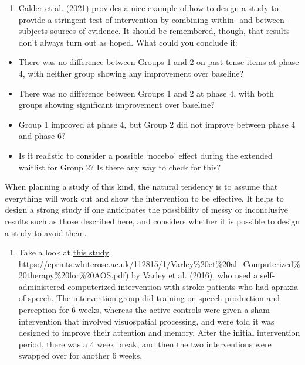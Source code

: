 \documentclass{krantz}
\providecommand{\tightlist}{%
\setlength{\itemsep}{0pt}\setlength{\parskip}{0pt}}
\begin{document}
\begin{enumerate}
\def\labelenumi{\arabic{enumi}.}
\tightlist
\item
  Calder et al. (\protect\hyperlink{ref-calder2021}{2021}) provides a nice example of how to design a study to provide a stringent test of intervention by combining within- and between-subjects sources of evidence. It should be remembered, though, that results don't always turn out as hoped. What could you conclude if:
\end{enumerate}

\begin{itemize}
\tightlist
\item
  There was no difference between Groups 1 and 2 on past tense items at phase 4, with neither group showing any improvement over baseline?\\
\item
  There was no difference between Groups 1 and 2 at phase 4, with both groups showing significant improvement over baseline?\\
\item
  Group 1 improved at phase 4, but Group 2 did not improve between phase 4 and phase 6?\\
\item
  Is it realistic to consider a possible `nocebo' effect during the extended waitlist for Group 2? Is there any way to check for this?
\end{itemize}

When planning a study of this kind, the natural tendency is to assume that everything will work out and show the intervention to be effective. It helps to design a strong study if one anticipates the possibility of messy or inconclusive results such as those described here, and considers whether it is possible to design a study to avoid them.

\begin{enumerate}
\def\labelenumi{\arabic{enumi}.}
\setcounter{enumi}{1}
\tightlist
\item
  Take a look at \href{https://eprints.whiterose.ac.uk/112815/1/Varley\%20et\%20al_Computerized\%20therapy\%20for\%20AOS.pdf}{this study https://eprints.whiterose.ac.uk/112815/1/Varley\%20et\%20al\_Computerized\%20therapy\%20for\%20AOS.pdf)} by Varley et al. (\protect\hyperlink{ref-varley2016}{2016}), who used a self-administered computerized intervention with stroke patients who had apraxia of speech. The intervention group did training on speech production and perception for 6 weeks, whereas the active controls were given a sham intervention that involved visuospatial processing, and were told it was designed to improve their attention and memory. After the initial intervention period, there was a 4 week break, and then the two interventions were swapped over for another 6 weeks.
\end{enumerate}
\end{document}
